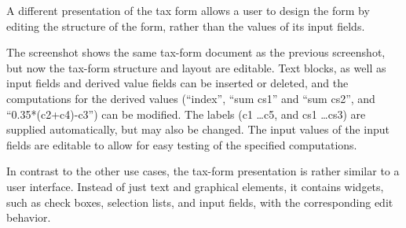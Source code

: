 
A different presentation of the tax form allows a user to design the form by editing the structure of the form, rather than the values of its input fields.


The screenshot shows the same tax-form document as the previous screenshot, but now the tax-form structure and layout are editable. Text blocks, as well as input fields and derived value fields can be inserted or deleted, and the computations for the derived values (``index'', ``sum cs1'' and ``sum cs2'', and ``0.35*(c2+c4)-c3'') can be modified. The labels (c1 \dots c5, and cs1 \dots cs3) are supplied automatically, but may also be changed. The input values of the input fields are editable to allow for easy testing of the specified computations. 



In contrast to the other use cases, the tax-form presentation is rather similar to a user interface. Instead of just text and graphical elements, it contains widgets, such as check boxes, selection lists, and input fields, with the corresponding edit behavior.

